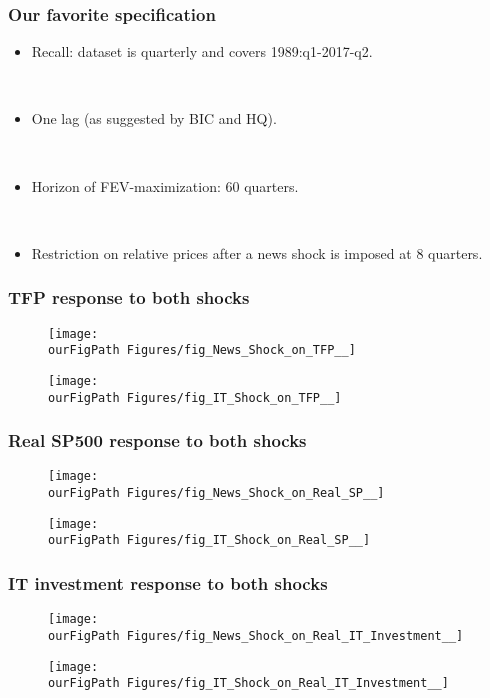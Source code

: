 \documentclass{beamer}
\def \ourFigPath {../../}
\begin{document}
\begin{frame}
	\frametitle{Our favorite specification}
	
	\begin{itemize}
	\item Recall: dataset is quarterly and covers 1989:q1-2017-q2.
	
	\
	
	\item One lag (as suggested by BIC and HQ).
	
	\
	
	\item Horizon of FEV-maximization: 60 quarters.
	
	\
	
	\item Restriction on relative prices after a news shock is imposed at 8 quarters.
	
	\end{itemize}


	
	
\end{frame}

\begin{frame}
\frametitle{TFP response to both shocks}
\begin{figure}
	\centering
	\texttt{[image: \\ourFigPath Figures/fig\_News\_Shock\_on\_TFP\_\_]} %
\end{figure}
\begin{figure}
	\centering
	\texttt{[image: \\ourFigPath Figures/fig\_IT\_Shock\_on\_TFP\_\_]}
\end{figure}
\end{frame}

\begin{frame}
\frametitle{Real SP500 response to both shocks}
\begin{figure}
	\centering
	\texttt{[image: \\ourFigPath Figures/fig\_News\_Shock\_on\_Real\_SP\_\_]}
\end{figure}
\begin{figure}
	\centering
	\texttt{[image: \\ourFigPath Figures/fig\_IT\_Shock\_on\_Real\_SP\_\_]}
\end{figure}
\end{frame}

\begin{frame}
\frametitle{IT investment response to both shocks}
\begin{figure}
	\centering
	\texttt{[image: \\ourFigPath Figures/fig\_News\_Shock\_on\_Real\_IT\_Investment\_\_]}
\end{figure}
\begin{figure}
	\centering
	\texttt{[image: \\ourFigPath Figures/fig\_IT\_Shock\_on\_Real\_IT\_Investment\_\_]}
\end{figure}
\end{frame}
\end{document}
